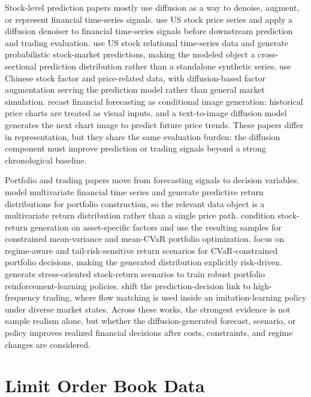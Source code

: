 \documentclass[sigconf,nonacm]{acmart}
\begin{document}
Stock-level prediction papers mostly use diffusion as a way to denoise, augment,
or represent financial time-series signals. \citet{wang2024ftsdenoiser} use US
stock price series and apply a diffusion denoiser to financial time-series
signals before downstream prediction and trading evaluation. \citet{daiya2024diffstock}
use US stock relational time-series data and generate probabilistic stock-market
predictions, making the modeled object a cross-sectional prediction distribution
rather than a standalone synthetic series. \citet{gao2024diffsformer} use Chinese
stock factor and price-related data, with diffusion-based factor augmentation
serving the prediction model rather than general market simulation.
\citet{lee2025charts} recast financial forecasting as conditional image
generation: historical price charts are treated as visual inputs, and a
text-to-image diffusion model generates the next chart image to predict future
price trends. These papers differ in representation, but they share the same
evaluation burden: the diffusion component must improve prediction or trading
signals beyond a strong chronological baseline.

Portfolio and trading papers move from forecasting signals to decision variables.
\citet{cho2025diffolio} model multivariate financial time series and generate
predictive return distributions for portfolio construction, so the relevant data
object is a multivariate return distribution rather than a single price path.
\citet{gao2025factorcond} condition stock-return generation on asset-specific
factors and use the resulting samples for constrained mean-variance and
mean-CVaR portfolio optimization. \citet{alzahrani2025marcd} focus on
regime-aware and tail-risk-sensitive return scenarios for CVaR-constrained
portfolio decisions, making the generated distribution explicitly risk-driven.
\citet{choudhary2025diffaugrl} generate stress-oriented stock-return scenarios to
train robust portfolio reinforcement-learning policies. \citet{li2025flowhft}
shift the prediction-decision link to high-frequency trading, where flow matching
is used inside an imitation-learning policy under diverse market states. Across
these works, the strongest evidence is not sample realism alone, but whether the
diffusion-generated forecast, scenario, or policy improves realized financial
decisions after costs, constraints, and regime changes are considered.

\section{Limit Order Book Data}\label{sec:lob}
\end{document}
